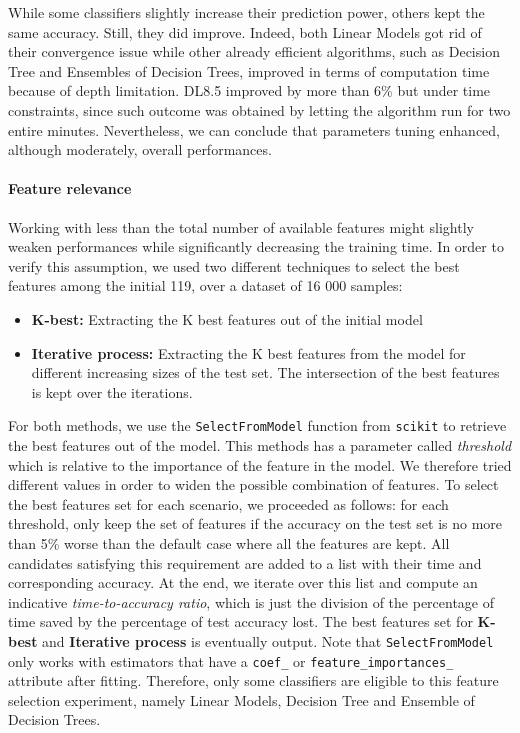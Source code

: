 While some classifiers slightly increase their prediction power, others kept the same accuracy. Still, they did improve. Indeed, both Linear Models got rid of their convergence issue while other already efficient algorithms, such as Decision Tree and Ensembles of Decision Trees, improved in terms of computation time because of depth limitation.
DL8.5 improved by more than 6\% but under time constraints, since such outcome was obtained by letting the algorithm run for two entire minutes.
Nevertheless, we can conclude that parameters tuning enhanced, although moderately, overall performances.

\paragraph{Feature relevance}

Working with less than the total number of available features might slightly weaken performances while significantly decreasing the training time. In order to verify this assumption, we used two different techniques to select the best features among the initial 119, over a dataset of 16 000 samples:
\begin{itemize}
    \item \textbf{K-best:} Extracting the K best features out of the initial model
    \item \textbf{Iterative process:} Extracting the K best features from the model for different increasing sizes of the test set. The intersection of the best features is kept over the iterations.
\end{itemize}

For both methods, we use the \texttt{SelectFromModel} function from \texttt{scikit} to retrieve the best features out of the model. This methods has a parameter called \textit{threshold} which is relative to the importance of the feature in the model. We therefore tried different values in order to widen the possible combination of features. To select the best features set for each scenario, we proceeded as follows: for each threshold, only keep the set of features if the accuracy on the test set is no more than 5\% worse than the default case where all the features are kept. All candidates satisfying this requirement are added to a list with their time and corresponding accuracy. At the end, we iterate over this list and compute an indicative \textit{time-to-accuracy ratio}, which is just the division of the percentage of time saved by the percentage of test accuracy lost. The best features set for \textbf{K-best} and \textbf{Iterative process} is eventually output. Note that \texttt{SelectFromModel} only works with estimators that have a \texttt{coef\_} or \texttt{feature\_importances\_} attribute after fitting. Therefore, only some classifiers are eligible to this feature selection experiment, namely Linear Models, Decision Tree and Ensemble of Decision Trees.


